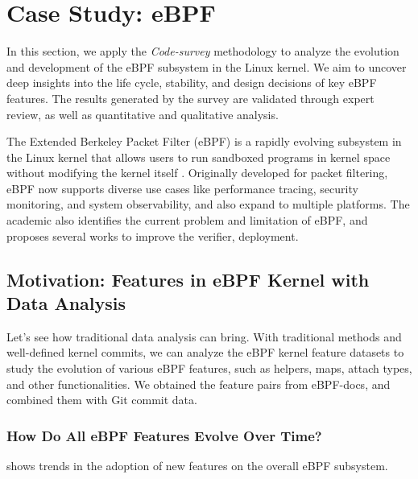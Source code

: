 \section{Case Study: eBPF}

In this section, we apply the \emph{Code-survey} methodology to analyze the evolution and development of the eBPF subsystem in the Linux kernel. We aim to uncover deep insights into the life cycle, stability, and design decisions of key eBPF features. The results generated by the survey are validated through expert review, as well as quantitative and qualitative analysis.

The Extended Berkeley Packet Filter (eBPF)\cite{ebpf} is a rapidly evolving subsystem in the Linux kernel that allows users to run sandboxed programs in kernel space without modifying the kernel itself \cite{lim2024safebpf}. Originally developed for packet filtering, eBPF now supports diverse use cases like performance tracing, security monitoring, and system observability, and also expand to multiple platforms\cite{windows-ebpf, zheng2023bpftime}. The academic also identifies the current problem and limitation of eBPF, and proposes several works to improve the verifier, deployment.


\subsection{Motivation: Features in eBPF Kernel with Data Analysis}

Let's see how traditional data analysis can bring. With traditional methods and well-defined kernel commits, we can analyze the eBPF kernel feature datasets to study the evolution of various eBPF features, such as helpers, maps, attach types, and other functionalities. We obtained the feature pairs from eBPF-docs\cite{ebpfdocs}, and combined them with Git commit data.

\subsubsection{How Do All eBPF Features Evolve Over Time?}

 shows trends in the adoption of new features on the overall eBPF subsystem.

